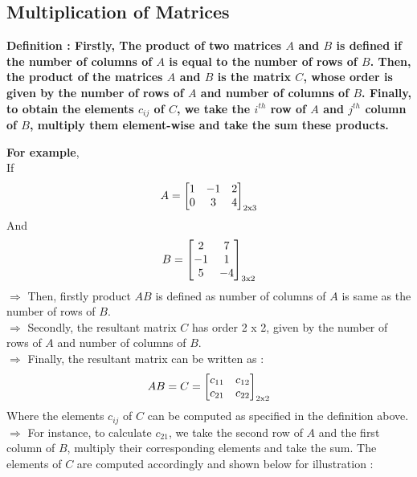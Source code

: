 \documentclass[12pt, letterpaper]{article}
\begin{document}
\subsection{Multiplication of Matrices}
\begin{displayquote}
\textbf{Definition : Firstly, The product of two matrices $A$ and $B$ is defined if the number of columns of $A$ is equal to the number of rows of $B$. Then, the product of the matrices $A$ and $B$ is the matrix $C$, whose order is given by the number of rows of $A$ and number of columns of $B$. Finally, to obtain the elements $c_{ij}$ of $C$, we take the $i^{th}$ row of $A$ and $j^{th}$ column of $B$, multiply them element-wise and take the sum these products.}  
\end{displayquote}
\textbf{For example},\\
If
\begin{displaymath}
 A = \begin{bmatrix}
1 & -1 & 2\\
0 & 3 & 4
\end{bmatrix}_{2 \textnormal{x} 3}
\end{displaymath} 
And 
\begin{displaymath}
B = \begin{bmatrix}
2 & 7\\
-1 & 1\\
5 & -4
\end{bmatrix}_{3 \textnormal{x} 2}
\end{displaymath}
$\Rightarrow$ Then, firstly product $AB$ is defined as number of columns of $A$ is same as the number of rows of $B$.\\
$\Rightarrow$ Secondly, the resultant matrix $C$ has order 2 x 2, given by the number of rows of $A$ and number of columns of $B$.\\
$\Rightarrow$ Finally, the resultant matrix can be written as : 
\begin{displaymath}
AB = C = \begin{bmatrix}
c_{11} & c_{12}\\
c_{21} & c_{22}
\end{bmatrix}_{2 \textnormal{x} 2}
\end{displaymath}
Where the elements $c_{ij}$ of $C$ can be computed as specified in the definition above.\\
$\Rightarrow$ For instance, to calculate $c_{21}$, we take the second row of $A$ and the first column of $B$, multiply their corresponding elements and take the sum. The elements of $C$ are computed accordingly and shown below for illustration :  
\end{document}
